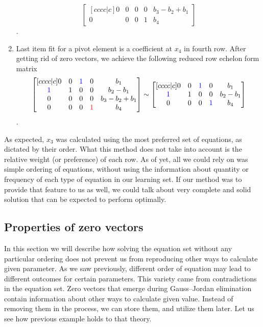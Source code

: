 \begin{enumerate}
\begin{equation}
\begin{bmatrix}[cccc|c]
    0 & 0 & 0 & 0 & b_3 - b_2 + b_1 \\ 
    0 & 0 & 0 & 1 & b_4
\end{bmatrix}
\end{equation}.
\item Last item fit for a pivot element is a coefficient at $x_4$ in fourth row.
After getting rid of zero vectors, we achieve the following reduced row echelon form matrix
\begin{equation}
\begin{bmatrix}[cccc|c]
    0 & 0 & \textcolor{blue}{1} & 0 & b_1 \\ 
    \textcolor{blue}{1} & 1 & 0 & 0 & b_2-b_1 \\ 
    0 & 0 & 0 & 0 & b_3 - b_2 + b_1 \\ 
    0 & 0 & 0 & \textcolor{red}{1} & b_4
\end{bmatrix}
\sim
\begin{bmatrix}[cccc|c]
    0 & 0 & \textcolor{blue}{1} & 0 & b_1 \\ 
    \textcolor{blue}{1} & 1 & 0 & 0 & b_2-b_1 \\ 
    0 & 0 & 0 & \textcolor{blue}{1} & b_4
\end{bmatrix}
\end{equation}.
\end{enumerate}

As expected, $x_3$ was calculated using the most preferred set of equations, as dictated by their order.
What this method does not take into account is the relative weight (or preference) of each row.
As of yet, all we could rely on was simple ordering of equations, without using the information about quantity or frequency of each type of equation in our learning set.
If our method was to provide that feature to us as well, we could talk about very complete and solid solution that can be expected to perform optimally.

\subsection{Properties of zero vectors}
In this section we will describe how solving the equation set without any particular ordering does not prevent us from reproducing other ways to calculate given parameter.
As we saw previously, different order of equation may lead to different outcomes for certain parameters.
This variety came from contradictions in the equation set.
Zero vectors that emerge during Gauss--Jordan elimination contain information about other ways to calculate given value.
Instead of removing them in the process, we can store them, and utilize them later.
Let us see how previous example holds to that theory.

